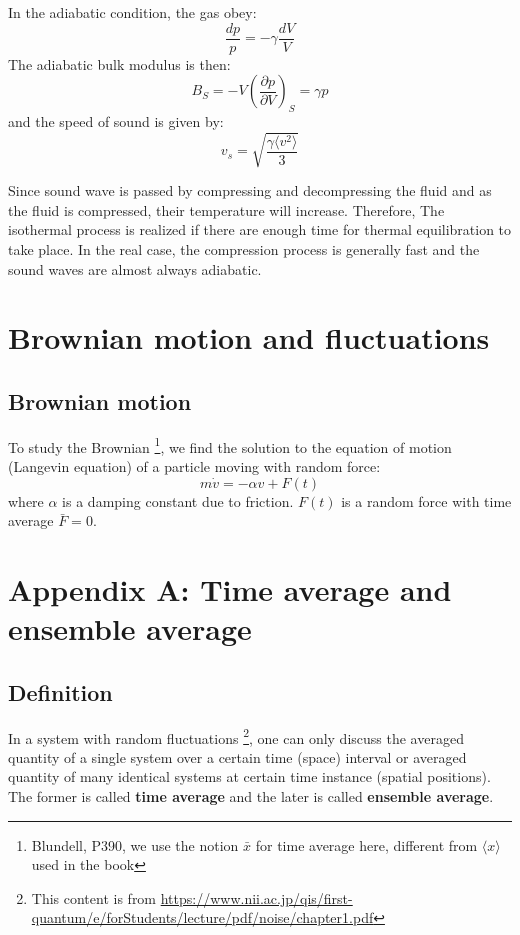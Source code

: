 \documentclass{article}
\newcommand{\pfrac}[2]{\frac{\partial #1}{\partial #2}}
\begin{document}
In the adiabatic condition, the gas obey:
\begin{equation}
    \frac{dp}{p} = -\gamma \frac{dV}{V}
\end{equation}
The adiabatic bulk modulus is then:
\begin{equation}
    B_S = -V \left( \pfrac{p}{V} \right)_S = \gamma p
\end{equation}
and the speed of sound is given by:
\begin{equation}
    v_s = \sqrt{\frac{\gamma\langle v^2 \rangle }{3}}    
\end{equation}

Since sound wave is passed by compressing and decompressing the fluid and as the fluid is compressed, their 
temperature will increase. Therefore,
The isothermal process is realized if there are enough time for thermal equilibration to take place.  
In the real case, the compression process is generally fast and the sound waves are almost always adiabatic.

\section{Brownian motion and fluctuations}
\subsection*{Brownian motion}
To study the Brownian
\footnote{Blundell, P390, we use the notion $\bar{x}$ for time average here, 
different from $\langle x \rangle$ used in the book}, 
we find the solution to the equation of motion (Langevin equation)
of a particle moving with random force:
\begin{equation}
    m\dot{v} = -\alpha v + F(t)
\end{equation}
where $\alpha$ is a damping constant due to friction. $F(t)$ is a random force with 
time average $\bar{F} = 0$.

\pagebreak
\section*{Appendix A: Time average and ensemble average}
\subsection*{Definition}
In a system with random fluctuations
\footnote{This content is from \url{https://www.nii.ac.jp/qis/first-quantum/e/forStudents/lecture/pdf/noise/chapter1.pdf}}, 
one can only discuss the averaged quantity of a single system over a certain
time (space) interval or averaged quantity of many identical systems at certain 
time instance (spatial positions). The former is called \textbf{time average} and 
the later is called \textbf{ensemble average}. 
\end{document}
